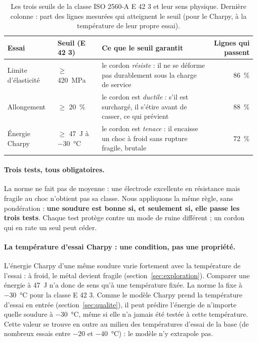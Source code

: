 \begin{table}[!htbp]
  \centering\small
  \begin{tabularx}{\linewidth}{@{}l l Y r@{}}
    \toprule
    \textbf{Essai} & \textbf{Seuil (E 42 3)} & \textbf{Ce que le seuil garantit} &
    \textbf{Lignes qui passent} \\
    \midrule
    Limite d'élasticité & $\geq$ \SI{420}{\mega\pascal} & le cordon \emph{résiste} :
      il ne se déforme pas durablement sous la charge de service & \SI{86}{\percent} \\
    Allongement & $\geq$ \SI{20}{\percent} & le cordon est \emph{ductile} : s'il est
      surchargé, il s'étire avant de casser, ce qui prévient & \SI{88}{\percent} \\
    Énergie Charpy & $\geq$ \SI{47}{\joule} à \SI{-30}{\celsius} & le cordon est
      \emph{tenace} : il encaisse un choc à froid sans rupture fragile, brutale & \SI{72}{\percent} \\
    \bottomrule
  \end{tabularx}
  \caption{Les trois seuils de la classe ISO 2560-A E 42 3 et leur sens physique.
    Dernière colonne : part des lignes mesurées qui atteignent le seuil (pour le Charpy,
    à la température de leur propre essai).}
  \label{tab:seuils}
\end{table}

\paragraph{Trois tests, tous obligatoires.} La norme ne fait pas de moyenne : une
électrode excellente en résistance mais fragile au choc n'obtient pas sa classe. Nous
appliquons la même règle, sans pondération : \textbf{une soudure est bonne si, et
seulement si, elle passe les trois tests}. Chaque test protège contre un mode de
ruine différent ; un cordon qui en rate un seul peut céder.

\paragraph{La température d'essai Charpy : une condition, pas une propriété.} L'énergie
Charpy d'une même soudure varie fortement avec la température de l'essai : à froid, le
métal devient fragile (section~\ref{sec:exploration}). Comparer une énergie à
\SI{47}{\joule} n'a donc de sens qu'à une température fixée. La norme la fixe à
\SI{-30}{\celsius} pour la classe E 42 3. Comme le modèle Charpy prend la température
d'essai en entrée (section~\ref{sec:qualite}), il peut prédire l'énergie de n'importe
quelle soudure à \SI{-30}{\celsius}, même si elle n'a jamais été testée à cette
température. Cette valeur se trouve en outre au milieu des températures d'essai de la
base (de nombreux essais entre $-20$ et \SI{-40}{\celsius}) : le modèle n'y extrapole
pas.

